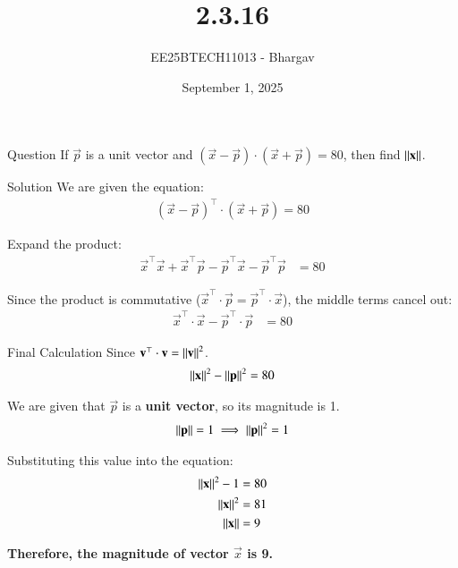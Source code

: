 \documentclass{beamer}
\title{2.3.16}
\author{EE25BTECH11013 - Bhargav}
\date{September 1, 2025}
\begin{document}
\frame{\titlepage}


\begin{frame}{Question}
    If $\vec{p}$ is a unit vector and $(\vec{x}-\vec{p})\cdot(\vec{x}+\vec{p})=80$, then find $\left\lVert\mathbf{x}\right\rVert$.
\end{frame}


\begin{frame}{Solution}
    We are given the equation:
    \begin{align}
        (\vec{x}-\vec{p})^\top \cdot(\vec{x}+\vec{p}) = 80
    \end{align}
    
    \vfill
    
    Expand the product:
    \begin{align}
        \vec{x}^\top \vec{x} + \vec{x}^\top \vec{p} - \vec{p}^\top \vec{x} - \vec{p}^\top \vec{p}&= 80
    \end{align}
    
    \vfill
    
    Since the product is commutative ($\vec{x}^\top \cdot\vec{p} = \vec{p}^\top \cdot\vec{x}$), the middle terms cancel out:
    \begin{align}
         \vec{x}^\top \cdot\vec{x} - \vec{p}^\top \cdot\vec{p} &= 80
    \end{align}
\end{frame}


\begin{frame}{Final Calculation}
    Since $\mathbf{v}^\top \cdot\mathbf{v} = \left\lVert\mathbf{v}\right\rVert^2$.
    \begin{align}
        \left\lVert\mathbf{x}\right\rVert^2 - \left\lVert\mathbf{p}\right\rVert^2 = 80
    \end{align}
    
    \vfill
    
    We are given that $\vec{p}$ is a \textbf{unit vector}, so its magnitude is 1.
    \begin{align}
        \left\lVert\mathbf{p}\right\rVert = 1 \implies \left\lVert\mathbf{p}\right\rVert^2 = 1
    \end{align}
    
    \vfill
    
    Substituting this value into the equation:
    \begin{align}
        \left\lVert\mathbf{x}\right\rVert^2 - 1 &= 80 \\
        \left\lVert\mathbf{x}\right\rVert^2 &= 81 \\
        \left\lVert\mathbf{x}\right\rVert &= 9
    \end{align}
    
    \vfill
    
    \textbf{Therefore, the magnitude of vector $\vec{x}$ is 9.}
\end{frame}
\end{document}
